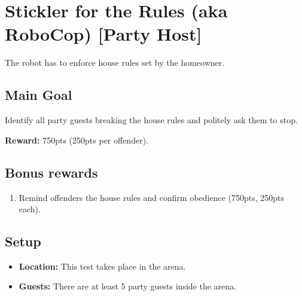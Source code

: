 \section{Stickler for the Rules (aka RoboCop) [Party Host]}
The robot has to enforce house rules set by the homeowner.


\subsection*{Main Goal}
Identify all party guests breaking the house rules and politely ask them to stop.

\noindent\textbf{Reward:} 750pts (250pts per offender).

\subsection*{Bonus rewards}
\begin{enumerate}[nosep]
	\item Remind offenders the house rules and confirm obedience (750pts, 250pts each).
\end{enumerate}

\subsection*{Setup}
\begin{itemize}[nosep]
	\item \textbf{Location:} This test takes place in the arena.
	\item \textbf{Guests:} There are at least 5 party guests inside the arena.
\end{itemize}


